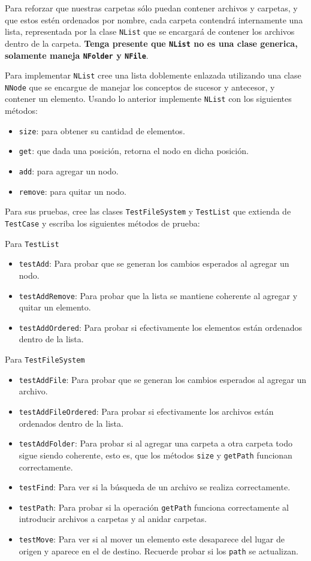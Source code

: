 \documentclass[11pt,spanish,letterpaper]{report}
\begin{document}
Para reforzar que nuestras carpetas sólo puedan contener archivos y carpetas, y que estos estén ordenados por nombre, cada carpeta contendrá internamente una lista, representada por la clase {\tt NList} que se encargará de contener los archivos dentro de la carpeta. \textbf{Tenga presente que {\tt NList} no es una clase generica, solamente maneja {\tt NFolder} y {\tt NFile}}.

Para implementar {\tt NList} cree una lista doblemente enlazada utilizando una clase {\tt NNode} que se encargue de manejar los conceptos de sucesor y antecesor, y contener un elemento. Usando lo anterior implemente {\tt NList} con los siguientes métodos:

\begin{itemize}
 	\item {\tt size}: para obtener su cantidad de elementos.
 	\item {\tt get}: que dada una posición, retorna el nodo en dicha posición.
 	\item {\tt add}: para agregar un nodo.
 	\item {\tt remove}: para quitar un nodo.
\end{itemize}

Para sus pruebas, cree las clases {\tt TestFileSystem} y {\tt TestList} que extienda de {\tt TestCase} y escriba los siguientes métodos de prueba:

Para {\tt TestList}
\begin{itemize}
	\item {\tt testAdd}: Para probar que se generan los cambios esperados al agregar un nodo.
	\item {\tt testAddRemove}: Para probar que la lista se mantiene coherente al agregar y quitar un elemento.
	\item {\tt testAddOrdered}: Para probar si efectivamente los elementos están ordenados dentro de la lista.
\end{itemize}

Para {\tt TestFileSystem}
\begin{itemize}
	\item {\tt testAddFile}: Para probar que se generan los cambios esperados al agregar un archivo.
	\item {\tt testAddFileOrdered}: Para probar si efectivamente los archivos están ordenados dentro de la lista.
	\item {\tt testAddFolder}: Para probar si al agregar una carpeta a otra carpeta todo sigue siendo coherente, esto es, que los métodos {\tt size} y {\tt getPath} funcionan correctamente.
	\item {\tt testFind}: Para ver si la búsqueda de un archivo se realiza correctamente.		
	\item {\tt testPath}: Para probar si la operación {\tt getPath} funciona correctamente al introducir archivos a carpetas y al anidar carpetas.
	\item {\tt testMove}: Para ver si al mover un elemento este desaparece del lugar de origen y aparece en el de destino. Recuerde probar si los {\tt path} se actualizan.
\end{itemize}
\end{document}

